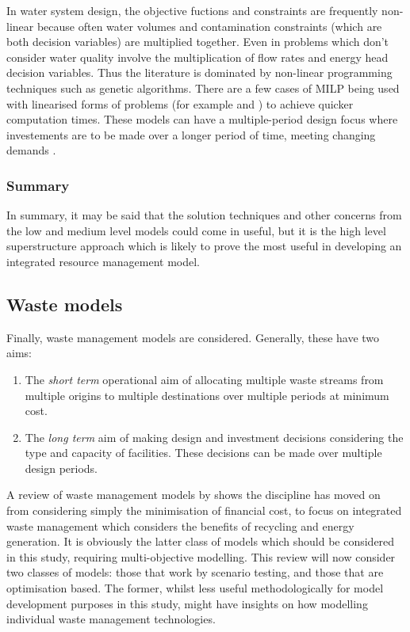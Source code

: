 In water system design, the objective fuctions and constraints are frequently non-linear because often water volumes and contamination constraints (which are both decision variables) are multiplied together. Even in problems which don't consider water quality involve the multiplication of flow rates and energy head decision variables. Thus the literature is dominated by non-linear programming techniques such as genetic algorithms. There are a few cases of MILP being used with linearised forms of problems (for example \citet{Zanganeh2010} and \citet{Lejano2006}) to achieve quicker computation times. These models can have a multiple-period design focus where investements are to be made over a longer period of time, meeting changing demands \citep{Chung2008}.

\subsubsection*{Summary}
In summary, it may be said that the solution techniques and other concerns from the low and medium level models could come in useful, but it is the high level superstructure approach which is likely to prove the most useful in developing an integrated resource management model.

\subsection{Waste models}
Finally, waste management models are considered. Generally, these have two aims:
\begin{enumerate}
	\item The \emph{short term} operational aim of allocating multiple waste streams from multiple origins to multiple destinations over multiple periods at minimum cost. 
	\item The \emph{long term} aim of making design and investment decisions considering the type and capacity of facilities. These decisions can be made over multiple design periods.
\end{enumerate}
A review of waste management models by \citet{Morrissey2004} shows the discipline has moved on from considering simply the minimisation of financial cost, to focus on integrated waste management which considers the benefits of recycling and energy generation. It is obviously the latter class of models which should be considered in this study, requiring multi-objective modelling. This review will now consider two classes of models: those that work by scenario testing, and those that are optimisation based. The former, whilst less useful methodologically for model development purposes in this study, might have insights on how modelling individual waste management technologies.

